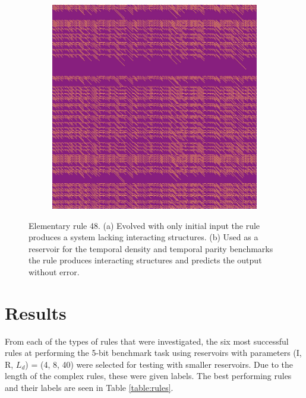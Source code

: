 \documentclass{elsarticle}
\begin{document}
\begin{multicols}{2}
\begin{figure}[H]
\begin{subfigure}[]{0.2\linewidth}
  \caption{}
  \end{subfigure}
\begin{subfigure}[]{0.2\linewidth}
  \includegraphics[width=\linewidth]{rule48_reservoir.jpg}
  \caption{}
  \end{subfigure}
  \caption{Elementary rule 48. (a) Evolved with only initial input the rule 
     produces a system lacking interacting structures. (b) Used as a reservoir 
        for the temporal density and temporal parity benchmarks the rule 
           produces interacting structures and predicts the output without 
              error.}
     \label{rule48}
     \end{figure}

\section{Results}\label{results}
From each of the types of rules that were investigated, the six most successful 
   rules at performing the 5-bit benchmark task using reservoirs with 
   parameters (I, R, $L_{d}$) = (4, 8, 40) were selected for testing with 
   smaller  reservoirs. Due to the length of the complex rules, these were 
   given labels.  The best performing rules and their labels are seen in Table
\ref{table:rules}. \par 



\end{multicols}
\end{document}
